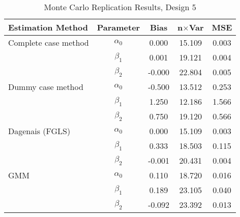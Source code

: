 \begin{table}
\centering
\caption{Monte Carlo Replication Results, Design 5}
\label{table:MCReplicationResultsDesign5}
\begin{tabular}{lcccc}
\toprule
Estimation Method & Parameter & Bias & n$\times$Var & MSE \\
\midrule
Complete case method & $\alpha_0$ & 0.000 & 15.109 & 0.003 \\
 & $\beta_1$ & 0.001 & 19.121 & 0.004 \\
 & $\beta_2$ & -0.000 & 22.804 & 0.005 \\
Dummy case method & $\alpha_0$ & -0.500 & 13.512 & 0.253 \\
 & $\beta_1$ & 1.250 & 12.186 & 1.566 \\
 & $\beta_2$ & 0.750 & 19.120 & 0.566 \\
Dagenais (FGLS) & $\alpha_0$ & 0.000 & 15.109 & 0.003 \\
 & $\beta_1$ & 0.333 & 18.503 & 0.115 \\
 & $\beta_2$ & -0.001 & 20.431 & 0.004 \\
GMM & $\alpha_0$ & 0.110 & 18.720 & 0.016 \\
 & $\beta_1$ & 0.189 & 23.105 & 0.040 \\
 & $\beta_2$ & -0.092 & 23.392 & 0.013 \\
\bottomrule
\end{tabular}
\end{table}
